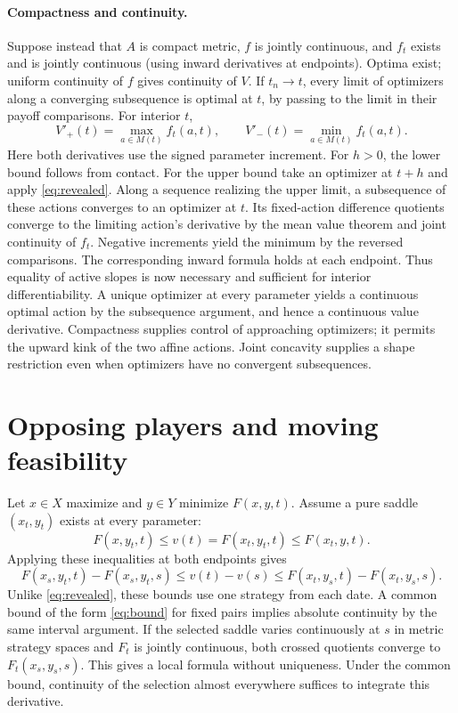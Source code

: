 \documentclass[11pt]{article}
\begin{document}
\paragraph{Compactness and continuity.}
Suppose instead that \(A\) is compact metric, \(f\) is jointly continuous, and \(f_t\) exists and is jointly continuous (using inward derivatives at endpoints). Optima exist; uniform continuity of \(f\) gives continuity of \(V\). If \(t_n\to t\), every limit of optimizers along a converging subsequence is optimal at \(t\), by passing to the limit in their payoff comparisons. For interior \(t\),
\[
 V'_+(t)=\max_{a\in M(t)} f_t(a,t),\qquad
 V'_-(t)=\min_{a\in M(t)} f_t(a,t).
\]
Here both derivatives use the signed parameter increment. For \(h>0\), the lower bound follows from contact. For the upper bound take an optimizer at \(t+h\) and apply \eqref{eq:revealed}. Along a sequence realizing the upper limit, a subsequence of these actions converges to an optimizer at \(t\). Its fixed-action difference quotients converge to the limiting action's derivative by the mean value theorem and joint continuity of \(f_t\). Negative increments yield the minimum by the reversed comparisons. The corresponding inward formula holds at each endpoint. Thus equality of active slopes is now necessary and sufficient for interior differentiability. A unique optimizer at every parameter yields a continuous optimal action by the subsequence argument, and hence a continuous value derivative. Compactness supplies control of approaching optimizers; it permits the upward kink of the two affine actions. Joint concavity supplies a shape restriction even when optimizers have no convergent subsequences.

\section{Opposing players and moving feasibility}

Let \(x\in X\) maximize and \(y\in Y\) minimize \(F(x,y,t)\). Assume a pure saddle \((x_t,y_t)\) exists at every parameter:
\[
 F(x,y_t,t)\leq v(t)=F(x_t,y_t,t)\leq F(x_t,y,t).
\]
Applying these inequalities at both endpoints gives
\begin{equation}
 F(x_s,y_t,t)-F(x_s,y_t,s)
 \leq v(t)-v(s)\leq
 F(x_t,y_s,t)-F(x_t,y_s,s).                       \label{eq:cross}
\end{equation}
Unlike \eqref{eq:revealed}, these bounds use one strategy from each date. A common bound of the form \eqref{eq:bound} for fixed pairs implies absolute continuity by the same interval argument. If the selected saddle varies continuously at \(s\) in metric strategy spaces and \(F_t\) is jointly continuous, both crossed quotients converge to \(F_t(x_s,y_s,s)\). This gives a local formula without uniqueness. Under the common bound, continuity of the selection almost everywhere suffices to integrate this derivative.
\end{document}
